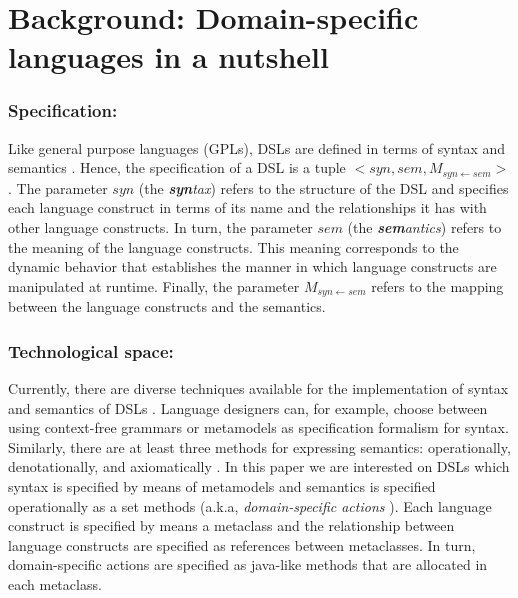 \section{Background: Domain-specific languages in a nutshell}
\label{sec:background}

\subsubsection{Specification:} Like general purpose languages (GPLs), DSLs are defined in terms of syntax and semantics \cite{Harel:2004b}. Hence, the specification of a DSL is a tuple $<syn,sem,M_{syn\leftarrow sem}>$ \cite{Combemale:2013}. The parameter $syn$ (the \textit{\textbf{syn}tax}) refers to the structure of the DSL and specifies each language construct in terms of its name and the relationships it has with other language constructs. In turn, the parameter $sem$ (the \textit{\textbf{sem}antics}) refers to the meaning of the language constructs. This meaning corresponds to the dynamic behavior that establishes the manner in which language constructs are manipulated at runtime. Finally, the parameter $M_{syn\leftarrow sem}$ refers to the mapping between the language constructs and the semantics. 
 

\vspace{-3mm}
\subsubsection{Technological space:} Currently, there are diverse techniques available for the implementation of syntax and semantics of DSLs \cite{Mernik:2005b}. Language designers can, for example, choose between using context-free grammars or metamodels as specification formalism for syntax. Similarly, there are at least three methods for expressing semantics: operationally, denotationally, and axiomatically \cite{Mosses:2001}. In this paper we are interested on DSLs which syntax is specified by means of metamodels and semantics is specified operationally as a set methods (a.k.a, \textit{domain-specific actions} \cite{Combemale:2013}). Each language construct is specified by means a metaclass and the relationship between language constructs are specified as references between metaclasses. In turn, domain-specific actions are specified as java-like methods that are allocated in each metaclass.
 
\vspace{-3mm}
